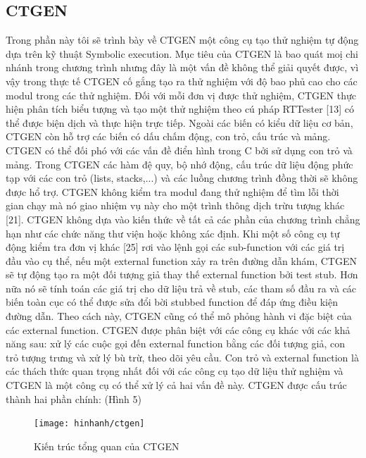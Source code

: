 \documentclass[12pt,a4paper]{article}
\begin{document}
\subsection{CTGEN}
Trong phần này tôi sẽ trình bày về CTGEN một công cụ tạo thử nghiệm tự động dựa trên kỹ thuật Symbolic execution. Mục tiêu của CTGEN là bao quát moị chi nhánh trong chương trình nhưng đây là một vấn đề không thể giải quyết được, vì vậy trong thực tế CTGEN cố gắng tạo ra thử nghiệm với độ bao phủ cao cho các modul trong các thử nghiệm. Đối với mỗi đơn vị được thử nghiệm, CTGEN thực hiện phân tích biểu tượng và tạo một thử nghiệm theo cú pháp RTTester [13] có thể được biện dịch và thực hiện trực tiếp. Ngoài các biến có kiểu dữ liệu cơ bản, CTGEN còn hỗ trợ các biến có dấu chấm động, con trỏ, cấu trúc và mảng. CTGEN có thể đối phó với các vấn đề điển hình trong C bởi sử dụng con trỏ và mảng. Trong CTGEN các hàm đệ quy, bộ nhớ động, cấu trúc dữ liệu động phức tạp với các con trỏ (lists, stacks,...) và các luồng chương trình đồng thời sẽ không được hổ trợ. CTGEN không kiểm tra modul đang thử nghiệm để tìm lỗi thời gian chạy mà nó giao nhiệm vụ này cho một trình thông dịch trừu tượng khác [21].\newline
\indent CTGEN không dựa vào kiến thức về tất cả các phần của chương trình chẳng hạn như các chức năng thư viện hoặc không xác định. Khi một số công cụ tự động kiểm tra đơn vị khác [25] rơi vào lệnh gọi các sub-function với các giá trị đầu vào cụ thể, nếu một external function xảy ra trên đường dẫn khám, CTGEN sẽ tự động tạo ra một đối tượng giả thay thế external function bởi test stub. Hơn nữa nó sẽ tính toán các giá trị cho dữ liệu trả về stub, các tham số đầu ra và các biến toàn cục có thể được sửa đổi bời stubbed function để đáp ứng điều kiện đường dẫn. Theo cách này, CTGEN cũng có thể mô phỏng hành vi đặc biệt của các external function.\newline
\indent CTGEN được phân biệt với các công cụ khác với các khả năng sau: xử lý các cuộc gọi đến external function bằng các đối tượng giả, con trỏ tượng trưng và xử lý bù trừ, theo dõi yêu cầu. Con trỏ và external function là các thách thức quan trọng nhất đối với các công cụ tạo dữ liệu thử nghiệm và CTGEN là một công cụ có thể xử lý cả hai vấn đề này. \newline
\indent CTGEN được cấu trúc thành hai phần chính: (Hình 5)\newline
\begin{figure}[ht]
\begin{center}
\texttt{[image: hinhanh/ctgen]}
\end{center}
\caption{Kiến trúc tổng quan của CTGEN}
\end{figure}
\end{document}
